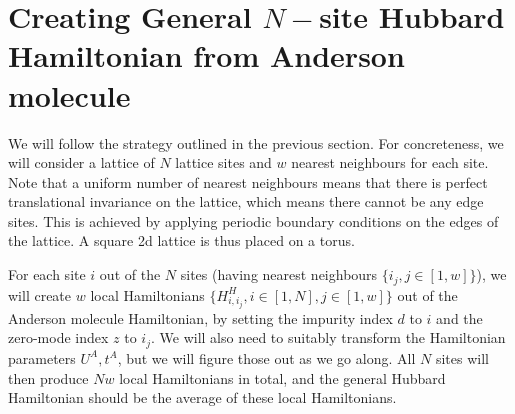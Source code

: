 \documentclass[12pt]{article}
\numberwithin{equation}{section}
\begin{document}
\section{Creating General \(N-\)site Hubbard Hamiltonian from Anderson molecule}
We will follow the strategy outlined in the previous section. For concreteness, we will consider a lattice of \(N\) lattice sites and \(w\) nearest neighbours for each site. Note that a uniform number of nearest neighbours means that there is perfect translational invariance on the lattice, which means there cannot be any edge sites. This is achieved by applying periodic boundary conditions on the edges of the lattice. A square 2d lattice is thus placed on a torus.


For each site \(i\) out of the \(N\) sites (having nearest neighbours \(\{i_j, j\in\left[1,w\right]\}\)), we will create \(w\) local Hamiltonians \(\{H^H_{i,i_j}, i\in \left[1,N\right], j \in \left[1,w\right]  \}\) out of the Anderson molecule Hamiltonian, by setting the impurity index \(d\) to \(i\) and the zero-mode index \(z\) to \(i_j\). We will also need to suitably transform the Hamiltonian parameters \(U^A, t^A\), but we will figure those out as we go along. All \(N\) sites will then produce \(Nw\) local Hamiltonians in total, and the general Hubbard Hamiltonian should be the average of these local Hamiltonians. 
\end{document}
